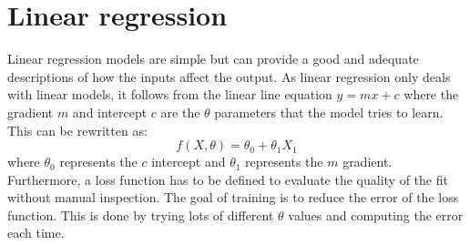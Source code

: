 \documentclass[CS5104-Notes.tex]{subfiles}
\begin{document}
\section{Linear regression}
Linear regression models are simple but can provide a good and adequate descriptions of how the inputs affect the output. As linear regression only deals with linear models, it follows from the linear line equation $y = mx + c$ where the gradient $m$ and intercept $c$ are the $\theta$ parameters that the model tries to learn. This can be rewritten as:
\begin{equation}
f(X, \theta) = \theta_{0} + \theta_{1}X_{1}
\end{equation}
where $\theta_{0}$ represents the $c$ intercept and $\theta_{1}$ represents the $m$ gradient.
\n
Furthermore, a loss function has to be defined to evaluate the quality of the fit without manual inspection. The goal of training is to reduce the error of the loss function. This is done by trying lots of different $\theta$ values and computing the error each time. 
\end{document}
